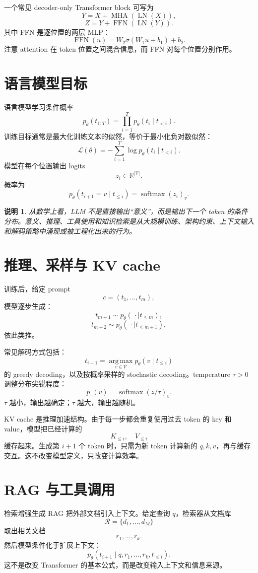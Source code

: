 \documentclass[UTF8,11pt,fontset=none]{ctexart}
\newtheorem{remark}[definition]{说明}
\newcommand{\R}{\mathbb{R}}
\newcommand{\Vocab}{\mathcal V}
\newcommand{\Loss}{\mathcal L}
\newcommand{\softmax}{\operatorname{softmax}}
\newcommand{\LN}{\operatorname{LN}}
\newcommand{\MHAttn}{\operatorname{MHA}}
\newcommand{\FFN}{\operatorname{FFN}}
\newcommand{\argmax}{\operatorname*{arg\,max}}
\begin{document}
一个常见 decoder-only Transformer block 可写为
\[
Y=X+\MHAttn(\LN(X)),
\]
\[
Z=Y+\FFN(\LN(Y)).
\]
其中 FFN 是逐位置的两层 MLP：
\[
\FFN(u)=W_2\sigma(W_1u+b_1)+b_2.
\]
注意 attention 在 token 位置之间混合信息，而 FFN 对每个位置分别作用。

\section{语言模型目标}

语言模型学习条件概率
\[
p_\theta(t_{1:T})=\prod_{i=1}^T p_\theta(t_i\mid t_{<i}).
\]
训练目标通常是最大化训练文本的似然，等价于最小化负对数似然：
\[
\Loss(\theta)
=
-\sum_{i=1}^T \log p_\theta(t_i\mid t_{<i}).
\]
模型在每个位置输出 logits
\[
z_i\in\R^{|\Vocab|}.
\]
概率为
\[
p_\theta(t_{i+1}=v\mid t_{\le i})
=
\softmax(z_i)_v.
\]

\begin{remark}
从数学上看，LLM 不是直接输出“意义”，而是输出下一个 token 的条件分布。意义、推理、工具使用和知识检索是从大规模训练、架构约束、上下文输入和解码策略中涌现或被工程化出来的行为。
\end{remark}

\section{推理、采样与 KV cache}

训练后，给定 prompt
\[
c=(t_1,\ldots,t_m),
\]
模型逐步生成：
\[
t_{m+1}\sim p_\theta(\,\cdot\mid t_{\le m}),
\]
\[
t_{m+2}\sim p_\theta(\,\cdot\mid t_{\le m+1}),
\]
依此类推。

常见解码方式包括：
\[
t_{i+1}=\argmax_{v\in\Vocab}p_\theta(v\mid t_{\le i})
\]
的 greedy decoding，以及按概率采样的 stochastic decoding。temperature \(\tau>0\) 调整分布尖锐程度：
\[
p_\tau(v)=
\softmax(z/\tau)_v.
\]
\(\tau\) 越小，输出越确定；\(\tau\) 越大，输出越随机。

KV cache 是推理加速结构。由于每一步都会重复使用过去 token 的 key 和 value，模型把已经计算的
\[
K_{\le i},\quad V_{\le i}
\]
缓存起来。生成第 \(i+1\) 个 token 时，只需为新 token 计算新的 \(q,k,v\)，再与缓存交互。这不改变模型定义，只改变计算效率。

\section{RAG 与工具调用}

检索增强生成 RAG 把外部文档引入上下文。给定查询 \(q\)，检索器从文档库
\[
\mathcal R=\{d_1,\ldots,d_M\}
\]
取出相关文档
\[
r_1,\ldots,r_k.
\]
然后模型条件化于扩展上下文：
\[
p_\theta(t_{i+1}\mid q,r_1,\ldots,r_k,t_{\le i}).
\]
这不是改变 Transformer 的基本公式，而是改变输入上下文和信息来源。
\end{document}
